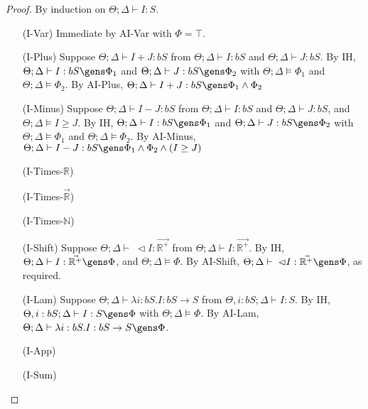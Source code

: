 \begin{proof}
By induction on $\Theta;\Delta \vdash I : S$.

\begin{itemize}
  \item[(I-Var)] Immediate by AI-Var with $\Phi = \top$.
  \item[(I-Plus)] Suppose $\Theta ; \Delta \vdash I + J : bS$ from $\Theta ; \Delta \vdash I : bS$ and $\Theta ; \Delta \vdash J : bS$. By IH, $\Theta ; \Delta \vdash I : bS \gens \Phi_1$ and $\Theta ; \Delta \vdash J : bS \gens \Phi_2$ with $\Theta ; \Delta \vDash \Phi_1$ and $\Theta; \Delta \vDash  \Phi_2$. By AI-Plus, $\Theta ; \Delta \vdash I + J : bS \gens \Phi_1 \wedge \Phi_2$
  \item[(I-Minus)] Suppose $\Theta ; \Delta \vdash I - J : bS$ from $\Theta ; \Delta \vdash I : bS$ and $\Theta ; \Delta \vdash J : bS$, and $\Theta ; \Delta \vDash I \geq J$. By IH, $\Theta ; \Delta \vdash I : bS \gens \Phi_1$ and $\Theta ; \Delta \vdash J : bS \gens \Phi_2$ with $\Theta ; \Delta \vDash \Phi_1$ and $\Theta; \Delta \vDash  \Phi_2$. By AI-Minus, $\Theta ; \Delta \vdash I - J : bS \gens \Phi_1 \wedge \Phi_2 \wedge (I \geq J)$
  \item[(I-Times-$\mathbb{R}$)]
  \item[(I-Times-$\vec{\mathbb{R}}$)] 
  \item[(I-Times-$\mathbb{N}$)]
  \item[(I-Shift)] Suppose $\Theta ; \Delta \vdash \; \lhd I : \vec{\mathbb{R}^+}$ from  $\Theta ; \Delta \vdash I : \vec{\mathbb{R}^+}$. By IH, $\Theta ; \Delta \vdash I : \vec{\mathbb{R}^+} \gens \Phi$, and $\Theta ; \Delta \vDash \Phi$.  By AI-Shift,  $\Theta ; \Delta \vdash \; \lhd I : \vec{\mathbb{R}^+} \gens \Phi$, as required.
  \item[(I-Lam)] Suppose $\Theta ; \Delta \vdash \lambda i : bS. I : bS \to S$ from $\Theta, i : bS ; \Delta \vdash I : S$. By IH, $\Theta, i : bS ; \Delta \vdash I : S \gens \Phi$ with $\Theta ; \Delta \vDash  \Phi$. By AI-Lam, $\Theta ; \Delta \vdash \lambda i : bS. I : bS \to S \gens \Phi$.
  \item[(I-App)]
  \item[(I-Sum)]
\end{itemize}
\end{proof}